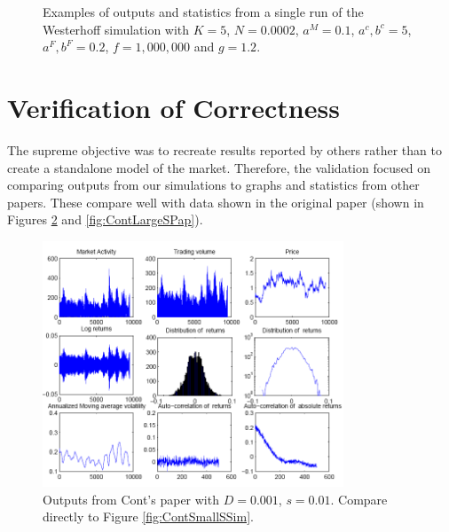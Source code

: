 \documentclass[runningheads]{llncs}
\begin{document}
\begin{figure}[htbp]
\begin{center}
{      \quad
      }
    \caption{Examples of outputs and statistics from a single run of the Westerhoff simulation with $K = 5$, $N=0.0002$, $a^M=0.1$, $a^c, b^c = 5$, $a^F, b^F = 0.2$, $f = 1,000,000$ and $g = 1.2$.}
    \label{fig:Westerhoffsim}
  \end{center}
\end{figure}

\section{Verification of Correctness}

The supreme objective was to recreate results reported by others rather than to create a standalone model of the market. Therefore, the validation focused on comparing outputs from our simulations to graphs and statistics from other papers. These compare well with data shown in the original paper (shown in Figures \ref{fig:ContSmallSPap} and \ref{fig:ContLargeSPap}).


\begin{figure}[htbp]
  \begin{center}
    \includegraphics[width=0.8\textwidth]{../graphics/Cont-Fig3.png}
    \caption{Outputs from Cont's paper with $D=0.001$, $s=0.01$. Compare directly to Figure \ref{fig:ContSmallSSim}.}
    \label{fig:ContSmallSPap}
  \end{center}
\end{figure}
\end{document}

